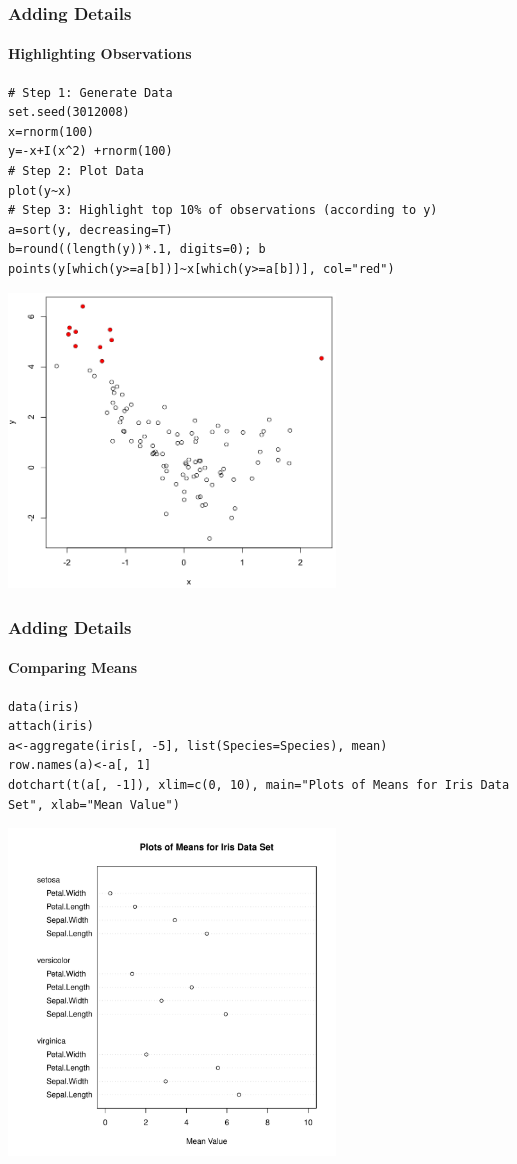\begin{frame}
  \frametitle{Adding Details}
  \framesubtitle{Highlighting Observations}
  	      
      		\begin{lstlisting}
# Step 1: Generate Data
set.seed(3012008)
x=rnorm(100)
y=-x+I(x^2) +rnorm(100)
# Step 2: Plot Data
plot(y~x)
# Step 3: Highlight top 10% of observations (according to y)
a=sort(y, decreasing=T)
b=round((length(y))*.1, digits=0); b
points(y[which(y>=a[b])]~x[which(y>=a[b])], col="red")
		\end{lstlisting}
%
\newpage
       \begin{center}
         \includegraphics[width=0.65\textwidth]{images/top10.png}
        \end{center}

\end{frame}


\begin{frame}
  \frametitle{Adding Details}
  \framesubtitle{Comparing Means}
	      
      		\begin{lstlisting}
data(iris)
attach(iris)
a<-aggregate(iris[, -5], list(Species=Species), mean)
row.names(a)<-a[, 1]
dotchart(t(a[, -1]), xlim=c(0, 10), main="Plots of Means for Iris Data Set", xlab="Mean Value")
		\end{lstlisting}
%
\newpage
       \begin{center}
         \includegraphics[width=0.65\textwidth]{images/aggPlot.pdf}
        \end{center}

\end{frame}